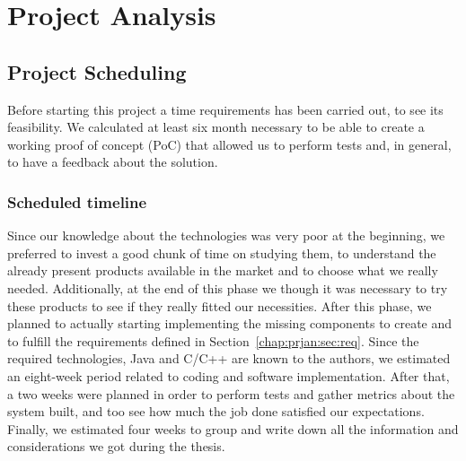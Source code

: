 \chapter{Project Analysis}
\label{chap:prjan}

\section{Project Scheduling}
\label{chap:prjan:sec:prjsche}

Before starting this project a time requirements has been carried out, to see
its feasibility. We calculated at least six month necessary to be able to create
a working proof of concept (PoC) that allowed us to perform tests and, in
general, to have a feedback about the solution.

\subsection{Scheduled timeline}
Since our knowledge about the technologies was very poor at the beginning, we
preferred to invest a good chunk of time on studying them, to understand the already
present products available in the market and to choose what we really needed.
Additionally, at the end of this phase we though it was necessary to try these
products to see if they really fitted our necessities. After this phase, we
planned to actually starting implementing the missing components to create and
to fulfill the requirements defined in Section~\ref{chap:prjan:sec:req}. Since
the required technologies, Java and C/C++ are known to the authors, we estimated
an eight-week period related to coding and software implementation. After that,
a two weeks were planned in order to perform tests and gather metrics about the
system built, and too see how much the job done satisfied our expectations.
Finally, we estimated four weeks to group and write down all the information and
considerations we got during the thesis.

